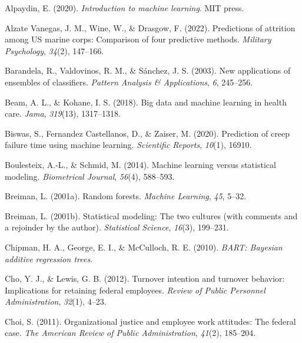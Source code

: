 \documentclass[
  man]{apa7}
\newlength{\cslhangindent}
\newenvironment{CSLReferences}[2] %
 {\begin{list}{}{%
  \setlength{\itemindent}{0pt}
  \setlength{\leftmargin}{0pt}
  \setlength{\parsep}{0pt}
  \ifodd #1
   \setlength{\leftmargin}{\cslhangindent}
   \setlength{\itemindent}{-1\cslhangindent}
  \fi
  \setlength{\itemsep}{#2\baselineskip}}}
 {\end{list}}
\begin{document}
\label{refs}
\begin{CSLReferences}{1}{0}
Alpaydin, E. (2020). \emph{Introduction to machine learning}. MIT press.

Alzate Vanegas, J. M., Wine, W., \& Drasgow, F. (2022). Predictions of attrition among US marine corps: Comparison of four predictive methods. \emph{Military Psychology}, \emph{34}(2), 147--166.

Barandela, R., Valdovinos, R. M., \& Sánchez, J. S. (2003). New applications of ensembles of classifiers. \emph{Pattern Analysis \& Applications}, \emph{6}, 245--256.

Beam, A. L., \& Kohane, I. S. (2018). Big data and machine learning in health care. \emph{Jama}, \emph{319}(13), 1317--1318.

Biswas, S., Fernandez Castellanos, D., \& Zaiser, M. (2020). Prediction of creep failure time using machine learning. \emph{Scientific Reports}, \emph{10}(1), 16910.

Boulesteix, A.-L., \& Schmid, M. (2014). Machine learning versus statistical modeling. \emph{Biometrical Journal}, \emph{56}(4), 588--593.

Breiman, L. (2001a). Random forests. \emph{Machine Learning}, \emph{45}, 5--32.

Breiman, L. (2001b). Statistical modeling: The two cultures (with comments and a rejoinder by the author). \emph{Statistical Science}, \emph{16}(3), 199--231.

Chipman, H. A., George, E. I., \& McCulloch, R. E. (2010). \emph{BART: Bayesian additive regression trees}.

Cho, Y. J., \& Lewis, G. B. (2012). Turnover intention and turnover behavior: Implications for retaining federal employees. \emph{Review of Public Personnel Administration}, \emph{32}(1), 4--23.

Choi, S. (2011). Organizational justice and employee work attitudes: The federal case. \emph{The American Review of Public Administration}, \emph{41}(2), 185--204.


\end{CSLReferences}
\end{document}
